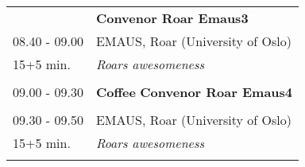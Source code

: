 \begin{table}[h!]
\begin{tabular}{p{3cm}p{13cm}}
&\hfill {\bf Convenor Roar Emaus3 }\\ 
08.40 - 09.00 & EMAUS, Roar (University of Oslo)\\ 
15+5 min. & {\it Roars awesomeness}\\ 
 & \\ 
09.00 - 09.30 & {\bf Coffee} \hfill {\bf Convenor Roar Emaus4 }\\ 
 & \\ 
09.30 - 09.50 & EMAUS, Roar (University of Oslo)\\ 
15+5 min. & {\it Roars awesomeness}\\ 
 & \\ 
\end{tabular}
\end{table}

